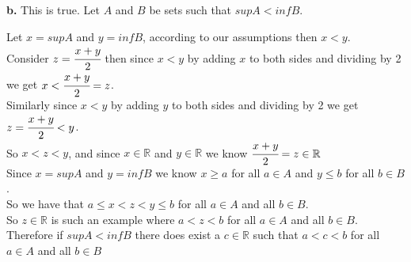 \documentclass{article}
\begin{document}
{\Large \textbf{b.}} This is true. Let $A$ and $B$ be sets such that $sup A < inf B$.
\begin{center}
    \doublespacing
    Let $x = sup A$ and $y = inf B$, according to our assumptions then $x < y$.
    \\Consider $z = \cfrac{x + y}{2}$ then since $x < y$ by adding $x$ to both sides and dividing by 2 we get $x <\cfrac{x + y}{2} = z$.
    \\Similarly since $x < y$ by adding $y$ to both sides and dividing by 2 we get $z =\cfrac{x + y}{2} < y$.
    \\So $x < z < y$, and since $x\in\mathbb{R}$ and $y\in\mathbb{R}$ we know $\cfrac{x + y}{2} = z\in\mathbb{R}$
    \\Since $x = sup A$ and $y = inf B$ we know $x\geq a$ for all $a\in A$ and $y\leq b$ for all $b\in B$.
    \\So we have that $a\leq x < z < y\leq b$ for all $a\in A$ and all $b\in B$.
    \\So $z\in\mathbb{R}$ is such an example where $a < z < b$ for all $a\in A$ and all $b\in B$.
    \\Therefore if $sup A < inf B$ there does exist a $c\in\mathbb{R}$ such that $a < c < b$ for all $a\in A$ and all $b\in B$ \qedsymbol
\end{center}
\end{document}
